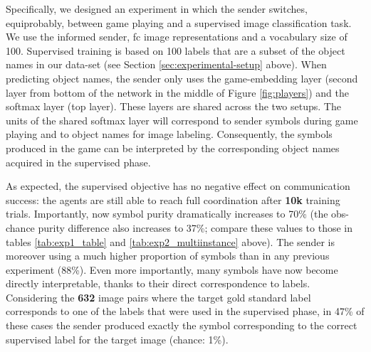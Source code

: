 Specifically, we designed an experiment in which the sender switches,
equiprobably, between game playing and a supervised image
classification task. We use the informed sender, fc image
representations and a vocabulary size of 100. Supervised training is
based on 100 labels that are a subset of the object names in our
data-set (see Section \ref{sec:experimental-setup} above). When
predicting object names, the sender only uses the game-embedding layer
(second layer from bottom of the network in the middle of Figure
\ref{fig:players}) and the softmax layer (top layer). These layers are
shared across the two setups. The units of the shared softmax layer
will correspond to sender symbols during game playing and to object
names for image labeling. Consequently, the symbols produced in the
game can be interpreted by the corresponding object names acquired in
the supervised phase.


As expected, the supervised objective has no negative effect on
communication success: the agents are still able to reach full
coordination after \textbf{10k} training trials.
Importantly, now symbol purity dramatically increases to 70\% (the
obs-chance purity difference also increases to 37\%; compare these
values to those in tables \ref{tab:exp1_table} and
\ref{tab:exp2_multiinstance} above). The sender is moreover using a
much higher proportion of symbols than in any previous experiment
(88\%). Even more importantly, many symbols have now become directly
interpretable, thanks to their direct correspondence to
labels. Considering the \textbf{632} image pairs where the target gold
standard label corresponds to one of the labels that were used in the
supervised phase, in 47\% of these cases the sender produced exactly
the symbol corresponding to the correct supervised label for the
target image (chance: 1\%). 


